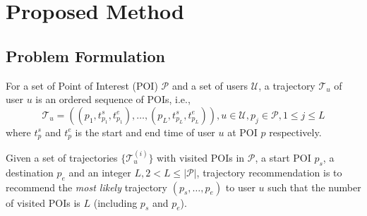 \section{Proposed Method}
\label{method}


\subsection{Problem Formulation}
\label{method:formulation}
For a set of Point of Interest (POI) $\mathcal{P}$ and a set of users $\mathcal{U}$,
a trajectory $\mathcal{T}_u$ of user $u$ is an ordered sequence of POIs,
i.e.,
\begin{displaymath}
    \mathcal{T}_u = ((p_1, t_{p_1}^s, t_{p_{1}}^e), \dots, (p_L, t_{p_L}^s, t_{p_L}^e)), 
    u \in \mathcal{U}, 
    p_j \in \mathcal{P}, 1 \le j \le L
\end{displaymath}
where $t_p^s$ and $t_p^e$ is the start and end time of user $u$ at POI $p$ respectively.

Given a set of trajectories $\{ \mathcal{T}_u^{(i)} \}$ with visited POIs in $\mathcal{P}$, 
a start POI $p_s$, a destination $p_e$ and an integer $L, 2 < L \le |\mathcal{P}|$,
trajectory recommendation is to recommend the \textit{most likely} trajectory $(p_s, \dots, p_e)$ to user $u$ such that
the number of visited POIs is $L$ (including $p_s$ and $p_e$).


